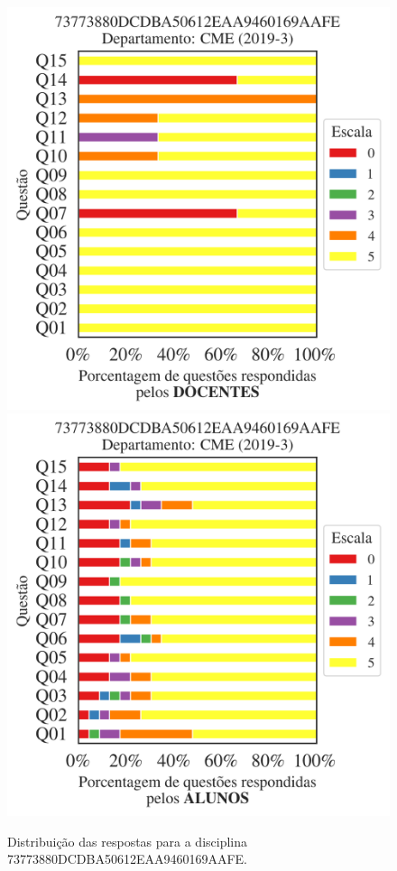 \documentclass[a4paper,10pt]{article}
\begin{document}
\begin{figure}[h]
\centering
\includegraphics[width=0.485\linewidth]{analise_disciplina_departamento_CME_73773880DCDBA50612EAA9460169AAFE_docentes.png}
\includegraphics[width=0.485\linewidth]{analise_disciplina_departamento_CME_73773880DCDBA50612EAA9460169AAFE_alunos.png}
\caption{\label{fig:analise_geral_departamento}                Distribuição das respostas para a disciplina 73773880DCDBA50612EAA9460169AAFE. }
\end{figure}
\end{document}
